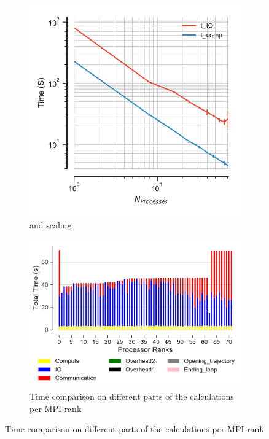 \begin{figure}[ht!]
\begin{subfigure}{.4\textwidth}
  \includegraphics[width=\linewidth]{figures/main-RMSD-time_comp_IO_comparison.pdf}
\caption{\tcomp and \tIO scaling}
\label{fig:ScalingComputeIO}
\end{subfigure}
\hfill
\begin{subfigure} {.5\textwidth}
  \includegraphics[width=\linewidth]{figures/main-RMSD-BarPlot-rank-comparison_72_4.pdf}
  \caption{Time comparison on different parts of the calculations per MPI rank}
  \label{fig:MPIranks}
\end{subfigure}


\end{figure}
